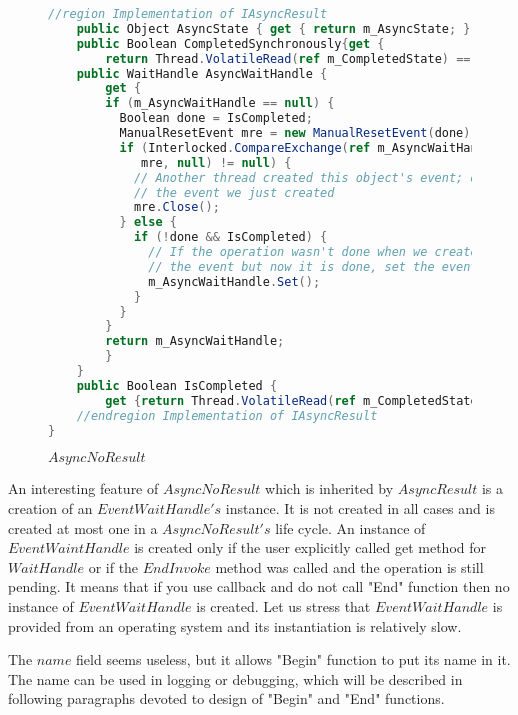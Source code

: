 \begin{figure}[!hbp]
\begin{lstlisting}[language=cs]
	//region Implementation of IAsyncResult
	public Object AsyncState { get { return m_AsyncState; } }
	public Boolean CompletedSynchronously{get { 
		return Thread.VolatileRead(ref m_CompletedState) ==  ic_scs; }}
	public WaitHandle AsyncWaitHandle {
	    get {
		if (m_AsyncWaitHandle == null) {
		  Boolean done = IsCompleted;
		  ManualResetEvent mre = new ManualResetEvent(done);
		  if (Interlocked.CompareExchange(ref m_AsyncWaitHandle,
		     mre, null) != null) {
		    // Another thread created this object's event; dispose 
		    // the event we just created
		    mre.Close();
		  } else {
		    if (!done && IsCompleted) {
		      // If the operation wasn't done when we created 
		      // the event but now it is done, set the event
		      m_AsyncWaitHandle.Set();
		    }
		  }
		}
		return m_AsyncWaitHandle;
	    }
	}
	public Boolean IsCompleted {
		get {return Thread.VolatileRead(ref m_CompletedState) != c_sp; }}
	//endregion Implementation of IAsyncResult
}
\end{lstlisting}
\caption{$AsyncNoResult$} 
\label{noresult}
\end{figure}


	An interesting feature of $AsyncNoResult$ which is inherited by $AsyncResult$ is a creation of an $EventWaitHandle's$ instance.
	It is not created in all cases and is created at most one in a $AsyncNoResult's$ life cycle.
	An instance of $EventWaintHandle$ is created only if the user explicitly called get method for $WaitHandle$ or
	if the $EndInvoke$ method was called and the operation is still pending.
	It means that if you use callback and do not call "End" function then no instance of $EventWaitHandle$ is created.
	Let us stress that $EventWaitHandle$ is provided from an operating system and its instantiation is relatively slow.

	The $name$ field seems useless, but it allows "Begin" function to put its name in it. 
	The name can be used in logging or debugging, which will be described in following paragraphs devoted 
	to design of "Begin" and "End" functions.

